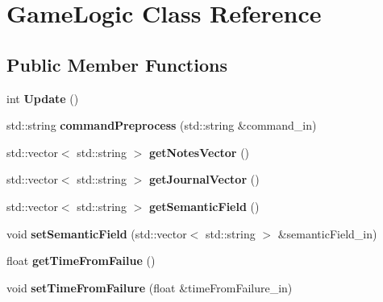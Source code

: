 \hypertarget{class_game_logic}{}\section{Game\+Logic Class Reference}
\label{class_game_logic}
\subsection*{Public Member Functions}
\begin{DoxyCompactItemize}
\item 
\mbox{\label{class_game_logic_a61c7eafc578436abda3c15800bd98c78}} 
int {\bfseries Update} ()
\item 
\mbox{\label{class_game_logic_a1a8c4fdc367c2bc921b3b081159ebbff}} 
std\+::string {\bfseries command\+Preprocess} (std\+::string \&command\+\_\+in)
\item 
\mbox{\label{class_game_logic_a17edd8fa6c3382ff41009663a3af41d3}} 
std\+::vector$<$ std\+::string $>$ {\bfseries get\+Notes\+Vector} ()
\item 
\mbox{\label{class_game_logic_a3bc3772c6bbd1f2c41d846ff7b9a00b0}} 
std\+::vector$<$ std\+::string $>$ {\bfseries get\+Journal\+Vector} ()
\item 
\mbox{\label{class_game_logic_a7f64e117929372d7f66f7b0f2b1e720c}} 
std\+::vector$<$ std\+::string $>$ {\bfseries get\+Semantic\+Field} ()
\item 
\mbox{\label{class_game_logic_aa9497ab8502f4fec671694423d384c65}} 
void {\bfseries set\+Semantic\+Field} (std\+::vector$<$ std\+::string $>$ \&semantic\+Field\+\_\+in)
\item 
\mbox{\label{class_game_logic_a10a107cb8c877fb5d2ae5e119a8b79c3}} 
float {\bfseries get\+Time\+From\+Failue} ()
\item 
\mbox{\label{class_game_logic_ac39ed0d4fc822e57f548dfae49f9f39d}} 
void {\bfseries set\+Time\+From\+Failure} (float \&time\+From\+Failure\+\_\+in)
\item 
\mbox{\label{class_game_logic_a7ee463feda998a94146e9ddd6f3daac6}} 

\end{DoxyCompactItemize}
